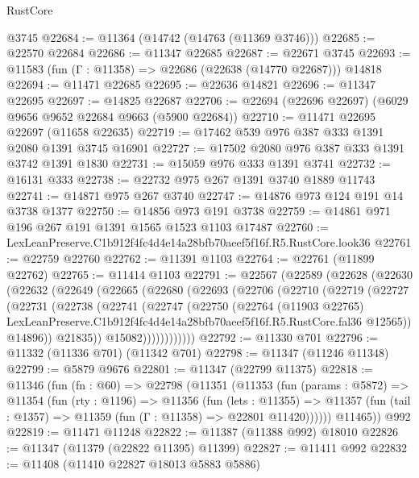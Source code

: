 \begin{lexlean}{RustCore}
\begin{coremodule}
    @3745
@22684 := @11364 (@14742 (@14763 (@11369 @3746)))
@22685 := @22570 @22684
@22686 := @11347 @22685
@22687 := @22671 @3745
@22693 := @11583 (fun (Γ : @11358) => @22686 (@22638 (@14770 @22687))) @14818
@22694 := @11471 @22685
@22695 := @22636 @14821
@22696 := @11347 @22695
@22697 := @14825 @22687
@22706 := @22694 (@22696 @22697) (@6029 @9656 @9652 @22684 @9663 (@5900 @22684))
@22710 := @11471 @22695 @22697 (@11658 @22635)
@22719 := @17462 @539 @976 @387 @333 @1391 @2080 @1391 @3745 @16901
@22727 := @17502 @2080 @976 @387 @333 @1391 @3742 @1391 @1830
@22731 := @15059 @976 @333 @1391 @3741
@22732 := @16131 @333
@22738 := @22732 @975 @267 @1391 @3740 @1889 @11743
@22741 := @14871 @975 @267 @3740
@22747 := @14876 @973 @124 @191 @14 @3738 @1377
@22750 := @14856 @973 @191 @3738
@22759 := @14861 @971 @196 @267 @191 @1391 @1565 @1523 @1103 @17487
@22760 := LexLeanPreserve.C1b912f4fc4d4e14a28bfb70aeef5f16f.R5.RustCore.look36
@22761 := @22759 @22760
@22762 := @11391 @1103
@22764 := @22761 (@11899 @22762)
@22765 := @11414 @1103
@22791 := @22567
    (@22589
      (@22628
        (@22630
          (@22632
            (@22649
              (@22665
                (@22680
                  (@22693
                    (@22706
                      (@22710
                        (@22719
                          (@22727
                            (@22731
                              (@22738
                                (@22741
                                  (@22747
                                    (@22750
                                      (@22764
                                        (@11903 @22765)
                                        LexLeanPreserve.C1b912f4fc4d4e14a28bfb70aeef5f16f.R5.RustCore.fal36
                                        @12565))
                                    @14896))
                                @21835))
                            @15082))))))))))))
@22792 := @11330 @701
@22796 := @11332 (@11336 @701) (@11342 @701)
@22798 := @11347 (@11246 @11348)
@22799 := @5879 @9676
@22801 := @11347 (@22799 @11375)
@22818 := @11346
    (fun (fn : @60) =>
    @22798
      (@11351
        (@11353
          (fun (params : @5872) =>
          @11354
            (fun (rty : @1196) =>
            @11356
              (fun (lets : @11355) =>
              @11357 (fun (tail : @1357) => @11359 (fun (Γ : @11358) => @22801 @11420))))))
        @11465))
    @992
@22819 := @11471 @11248
@22822 := @11387 (@11388 @992) @18010
@22826 := @11347 (@11379 (@22822 @11395) @11399)
@22827 := @11411 @992
@22832 := @11408 (@11410 @22827 @18013 @5883 @5886)

\end{coremodule}
\end{lexlean}
